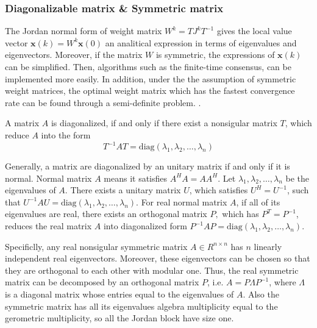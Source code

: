 \subsubsection{Diagonalizable matrix \& Symmetric matrix}

The Jordan normal form of weight matrix $W^{k}=TJ^{k}T^{-1}$
gives the local value vector $\mathbf{x}\left(k\right)=W^{k}\mathbf{x}\left(0\right)$
an analitical expression in terms of eigenvalues and eigenvectors.
Moreover, if the matrix $W$ is symmetric, the expressions
of $\mathbf{x}\left(k\right)$ can be simplified. Then, algorithms
such as the finite-time consensus, can be implemented more easily.
In addition, under the the assumption of symmetric weight matrices,
the optimal weight matrix which has the fastest convergence rate can
be found through a semi-definite problem. \cite{Li2010}. 
\begin{defn}
A matrix $A$ is diagonalized, if and only if there exist a nonsigular
matrix $T$, which reduce $A$ into the form 
\[
T^{-1}AT=\mbox{diag}\left(\lambda_{1},\lambda_{2},\ldots,\lambda_{n}\right)
\]

\end{defn}
Generally, a matrix are diagonalized by an unitary matrix if and only
if it is normal. Normal matrix $A$ means it satisfies $A^{H}A=AA^{H}$.
Let $\lambda_{1},\lambda_{2},\ldots,\lambda_{n}$ be the eigenvalues
of $A$. There exists a unitary matrix $U$, which satisfies $U^{H}=U^{-1}$,
such that $U^{-1}AU=\mbox{diag}\left(\lambda_{1},\lambda_{2},\ldots,\lambda_{n}\right)$.
For real normal matrix $A$, if all of its eigenvalues are real, there
exists an orthogonal matrix $P,$ which has $P^{T}=P^{-1}$, reduces
the real matrix $A$ into diagonalized form $P^{-1}AP=\mbox{diag}\left(\lambda_{1},\lambda_{2},\ldots,\lambda_{n}\right)$. 

Specificlly, any real nonsigular symmetric matrix $A\in R^{n\times n}$
has $n$ linearly independent real eigenvectors. Moreover, these eigenvectors
can be chosen so that they are orthogonal to each other with modular
one. Thus, the real symmetric matrix can be decomposed by an orthogonal
matrix $P$, i.e. $A=P\Lambda P^{-1}$, where $\Lambda$ is a diagonal
matrix whose entries equal to the eigenvalues of $A$. Also the symmetric
matrix has all its eigenvalues algebra multiplicity equal to the gerometric
multiplicity, so all the Jordan block have size one.
